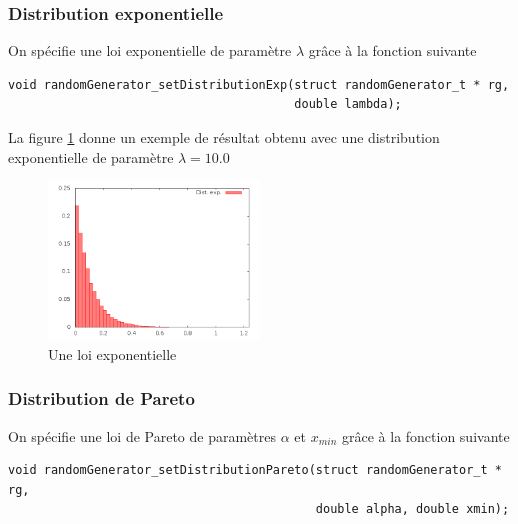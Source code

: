 %
\subsubsection{Distribution exponentielle}

   On spécifie une loi exponentielle de paramètre $\lambda$ grâce à la
fonction suivante 

\begin{verbatim}
void randomGenerator_setDistributionExp(struct randomGenerator_t * rg,
                                        double lambda);

\end{verbatim}

   La figure \ref{figure:distexp} donne un exemple de résultat obtenu
avec une distribution exponentielle de paramètre $\lambda = 10.0$

\begin{figure}[h]
\begin{center}
\includegraphics[width=0.5\textwidth]{DistributionExp.png}
\caption{Une loi exponentielle\label{figure:distexp}}
\end{center}
\end{figure}

%
\subsubsection{Distribution de Pareto}

   On spécifie une loi de Pareto de paramètres $\alpha$ et $x_{min}$
grâce à la  fonction suivante 

\begin{verbatim}
void randomGenerator_setDistributionPareto(struct randomGenerator_t * rg,
                                           double alpha, double xmin);
\end{verbatim}

